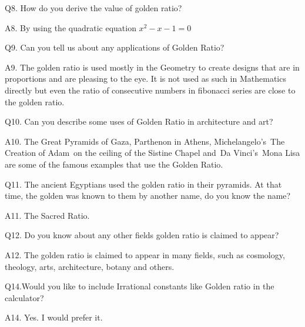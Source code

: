    Q8. How do you derive the value of golden ratio? 
   
   
   A8. By using the quadratic equation $x^2-x-1=0$
   \newline
   
   Q9. Can you tell us about any applications of Golden Ratio?
   
   
   A9. The golden ratio is used mostly in the Geometry to create designs that are in proportions and are
pleasing to the eye. It is not used as such in Mathematics directly but even the ratio of consecutive
numbers in fibonacci series are close to the golden ratio.
   \newline

   Q10. Can you describe some uses of Golden Ratio in architecture and art?
   
   
   A10. The Great Pyramids of Gaza, Parthenon in Athens, Michelangelo’s The Creation of Adam on the
ceiling of the Sistine Chapel and Da Vinci’s Mona Lisa are some of the famous examples that use the
Golden Ratio.
   \newline

  Q11. The ancient Egyptians used the golden ratio in their pyramids. At that time,     the golden was known to them by another name, do you know the name?
  
  
  A11. The Sacred Ratio.
  \newline

   Q12. Do you know about any other fields golden ratio is claimed to appear?
   
   
   A12. The golden ratio is claimed to appear in many fields, such as cosmology, theology, arts, architecture, botany and others.
   \newline
   
   Q14.Would you like to include Irrational constants like Golden ratio in the calculator?


A14. Yes. I would prefer it.

